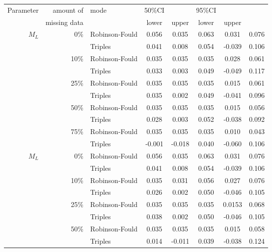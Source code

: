 \begin{tabular}{rrlccccc}
    \hline
    Parameter & amount of    & mode & 50\%CI &       & 95\%CI & \\
              & missing data &      & lower  & upper & lower  & upper \\
    \hline
    $M_L$     & 0\%          & Robinson-Fould & 0.056 & 0.035  & 0.063 & 0.031   & 0.076 \\ %
              &              & Triples        & 0.041 & 0.008  & 0.054 & -0.039  & 0.106 \\
              & 10\%         & Robinson-Fould & 0.035 & 0.035  & 0.035 & 0.028   & 0.061 \\
              &              & Triples        & 0.033 & 0.003  & 0.049 & -0.049  & 0.117 \\
              & 25\%         & Robinson-Fould & 0.035 & 0.035  & 0.035 & 0.015   & 0.061 \\
              &              & Triples        & 0.035 & 0.002  & 0.049 & -0.041  & 0.096 \\
              & 50\%         & Robinson-Fould & 0.035 & 0.035  & 0.035 & 0.015   & 0.056 \\
              &              & Triples        & 0.028 & 0.003  & 0.052 & -0.038  & 0.092 \\
              & 75\%         & Robinson-Fould & 0.035 & 0.035  & 0.035 & 0.010   & 0.043 \\
              &              & Triples        & -0.001 & -0.018 & 0.040 & -0.060 & 0.106 \\
    $M_L$     & 0\%          & Robinson-Fould & 0.056 & 0.035  & 0.063 & 0.031   & 0.076 \\
              &              & Triples        & 0.041 & 0.008  & 0.054 & -0.039  & 0.106 \\
              & 10\%         & Robinson-Fould & 0.035 & 0.031  & 0.056 & 0.027   & 0.076 \\
              &              & Triples        & 0.026 & 0.002  & 0.050 & -0.046  & 0.105 \\
              & 25\%         & Robinson-Fould & 0.035 & 0.035  & 0.035 & 0.0153  & 0.068 \\
              &              & Triples        & 0.038 & 0.002  & 0.050 & -0.046  & 0.105 \\
              & 50\%         & Robinson-Fould & 0.035 & 0.035  & 0.035 & 0.015   & 0.058 \\
              &              & Triples        & 0.014 & -0.011 & 0.039 & -0.038  & 0.124 \\

\end{tabular}

